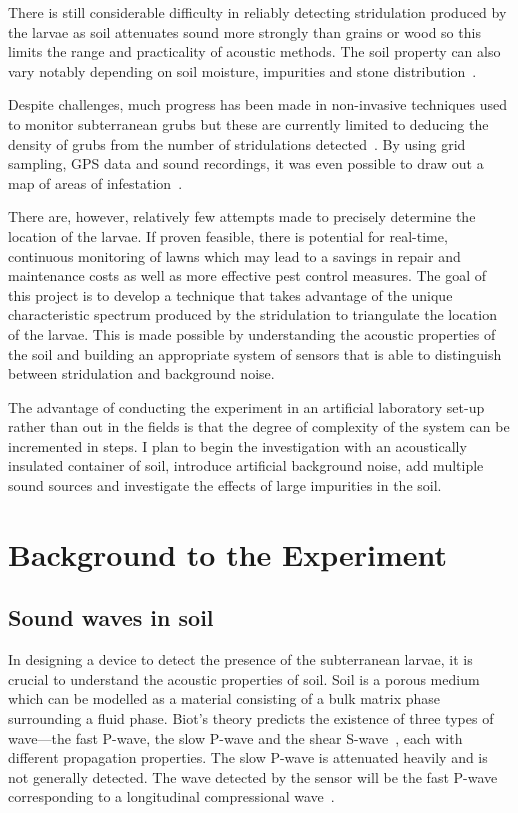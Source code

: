 \documentclass[twocolumn]{article}
\begin{document}
There is still considerable difficulty in reliably detecting stridulation produced by the larvae as soil attenuates sound more strongly than grains or wood so this limits the range and practicality of acoustic methods. The soil property can also vary notably depending on soil moisture, impurities and stone distribution~\cite{stridDetect}.

Despite challenges, much progress has been made in non-invasive techniques used to monitor subterranean grubs but these are currently limited to deducing the density of grubs from the number of stridulations detected~\cite{centuryDetect}. By using grid sampling, GPS data and sound recordings, it was even possible to draw out a map of areas of infestation~\cite{infestMap}\cite{anotherMap}.

There are, however, relatively few attempts made to precisely determine the location of the larvae. If proven feasible, there is potential for real-time, continuous monitoring of lawns which may lead to a savings in repair and maintenance costs as well as more effective pest control measures. The goal of this project is to develop a technique that takes advantage of the unique characteristic spectrum produced by the stridulation to triangulate the location of the larvae. This is made possible by understanding the acoustic properties of the soil and building an appropriate system of sensors that is able to distinguish between stridulation and background noise.

The advantage of conducting the experiment in an artificial laboratory set-up rather than out in the fields is that the degree of complexity of the system can be incremented in steps. I plan to begin the investigation with an acoustically insulated container of soil, introduce artificial background noise, add multiple sound sources and investigate the effects of large impurities in the soil.

\section{Background to the Experiment}
\subsection{Sound waves in soil}
In designing a device to detect the presence of the subterranean larvae, it is crucial to understand the acoustic properties of soil. Soil is a porous medium which can be modelled as a material consisting of a bulk matrix phase surrounding a fluid phase. Biot's theory predicts the existence of three types of wave---the fast P-wave, the slow P-wave and the shear S-wave~\cite{biot}, each with different propagation properties. The slow P-wave is attenuated heavily and is not generally detected. The wave detected by the sensor will be the fast P-wave corresponding to a longitudinal compressional wave~\cite{compactSoil}.
\end{document}
